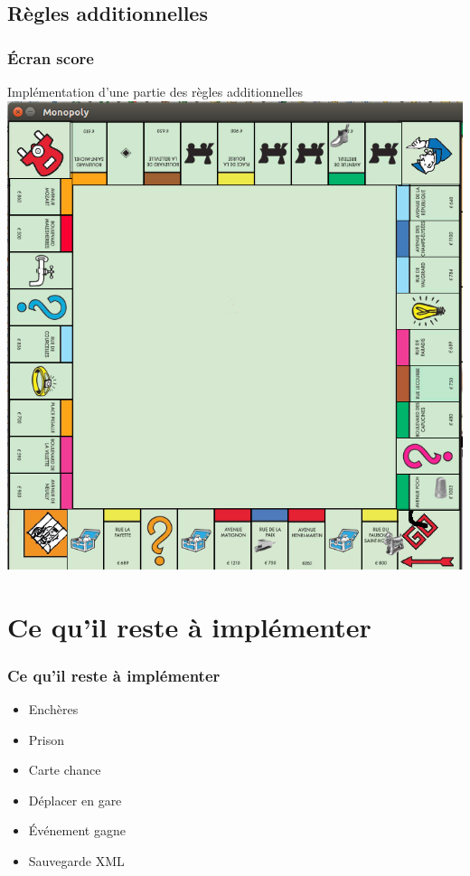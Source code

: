 \documentclass{beamer}
\begin{document}
\begin{darkframes}
	\subsection{Règles additionnelles}    
    \begin{frame}
 	 \frametitle{Écran score}
 	 \begin{center}
 	 Implémentation d'une partie des règles additionnelles
 	 \includegraphics[scale=0.30]{./img/plateauAlea.png}
		
	\end{center}
    \end{frame}
    
\section{Ce qu'il reste à implémenter}    
	\begin{frame}
 	 \frametitle{Ce qu'il reste à implémenter}
 	 \begin{itemize}
\item Enchères
\item Prison
\item Carte chance
\item Déplacer en gare
\item Événement gagne
\item Sauvegarde XML
\end{itemize}


\end{frame}
\end{darkframes}
\end{document}
